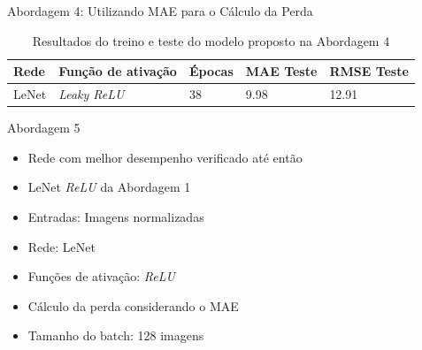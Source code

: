 \begin{frame}{\large{Abordagem 4: Utilizando MAE para o Cálculo da Perda}}
  \begin{table}[!ht]
		\caption{Resultados do treino e teste do modelo proposto na Abordagem 4}
		\label{tab:results-1}
		\begin{center}
			\begin{tabular}{l l l l l}
				\toprule
				Rede & Função de ativação & Épocas & MAE Teste & RMSE Teste \\
				\midrule
        LeNet & \emph{Leaky ReLU} & 38 & 9.98 & 12.91 \\
				\bottomrule
			\end{tabular}
		\end{center}
	\end{table}
\end{frame}



\begin{frame}{\large{Abordagem 5}}
 \begin{itemize}
   \item Rede com melhor desempenho verificado até então
   \item  \alert{LeNet \emph{ReLU} da Abordagem 1}
   \ \ \newline
   \item Entradas: \alert{Imagens normalizadas}
   \item Rede: LeNet
   \item Funções de ativação: \emph{ReLU}
   \ \ \newline
   \item Cálculo da perda considerando o MAE
   \item Tamanho do batch: 128 imagens
   \end{itemize}
\end{frame}

